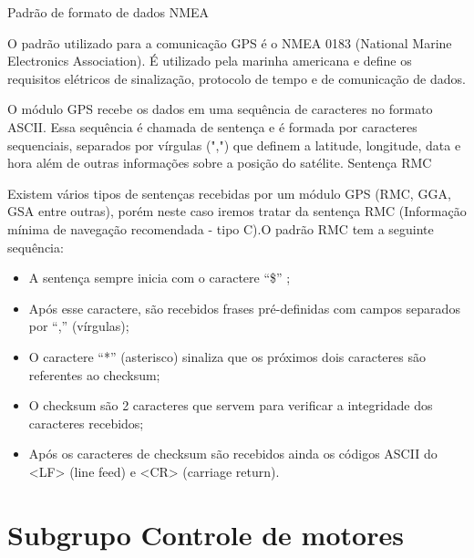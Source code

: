 Padrão de formato de dados NMEA

O padrão utilizado para a comunicação GPS é o NMEA 0183 (National Marine Electronics Association). É utilizado pela marinha americana e define os requisitos elétricos de sinalização,  protocolo de tempo e de comunicação de dados.

O módulo GPS recebe os dados em uma sequência de caracteres no formato ASCII. Essa sequência é chamada de sentença e é formada por caracteres sequenciais, separados por vírgulas (",") que definem a latitude, longitude, data e hora além de outras informações sobre a posição do satélite.
 Sentença RMC

Existem vários tipos de sentenças recebidas por um módulo GPS (RMC, GGA, GSA entre outras), porém neste caso iremos tratar da sentença RMC (Informação mínima de navegação recomendada - tipo C).O padrão RMC tem a seguinte sequência:
\begin{itemize}

\item A sentença sempre inicia com o caractere “\$” ;
\item Após esse caractere, são recebidos frases pré-definidas com campos separados por “,” (vírgulas);
\item O caractere “*” (asterisco) sinaliza que os próximos dois caracteres são referentes ao checksum;
\item O checksum são 2 caracteres que servem para verificar a integridade dos caracteres recebidos;
\item Após os caracteres de checksum são recebidos ainda os códigos ASCII do <LF> (line feed) e <CR> (carriage return).
\end{itemize}

\section{Subgrupo Controle de motores}

